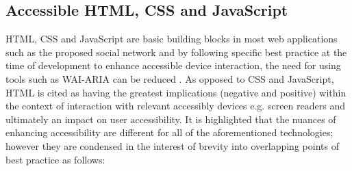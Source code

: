 \subsection{Accessible HTML, CSS and JavaScript}

HTML, CSS and JavaScript are basic building blocks in most web applications such as the proposed social network and by following specific best practice at the time of development to enhance accessible device interaction, the need for using tools such as WAI-ARIA can be reduced \cite{W3C,OWASP,Mills2015,Mills2016}. As opposed to CSS and JavaScript, HTML is cited as having the greatest implications (negative and positive)  within the context of interaction with relevant accessibly devices e.g. screen readers \cite{Mills,Mills2017} and ultimately an impact on user accessibility.  It is highlighted that the nuances of enhancing accessibility are different for all of the aforementioned technologies; however they are condensed in the interest of brevity into overlapping points of best practice as follows:


